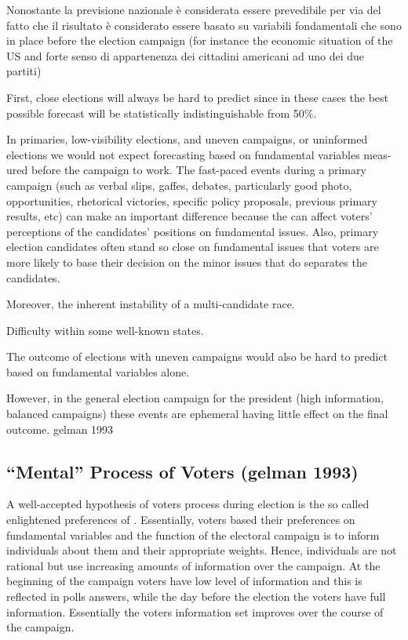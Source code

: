 \documentclass[
  12pt]{article}
\begin{document}
Nonostante la previsione nazionale è considerata essere prevedibile per
via del fatto che il risultato è considerato essere basato su variabili
fondamentali che sono in place before the election campaign (for
instance the economic situation of the US and forte senso di
appartenenza dei cittadini americani ad uno dei due partiti)

First, close elections will always be hard to predict since in these
cases the best possible forecast will be statistically indistinguishable
from 50\%.

In primaries, low-visibility elections, and uneven campaigns, or
uninformed elections we would not expect forecasting based on
fundamental variables meas- ured before the campaign to work. The
fast-paced events during a primary campaign (such as verbal slips,
gaffes, debates, particularly good photo, opportunities, rhetorical
victories, specific policy proposals, previous primary results, etc) can
make an important difference because the can affect voters' perceptions
of the candidates' positions on fundamental issues. Also, primary
election candidates often stand so close on fundamental issues that
voters are more likely to base their decision on the minor issues that
do separates the candidates.

Moreover, the inherent instability of a multi-candidate race.

Difficulty within some well-known states.

The outcome of elections with uneven campaigns would also be hard to
predict based on fundamental variables alone.

However, in the general election campaign for the president (high
information, balanced campaigns) these events are ephemeral having
little effect on the final outcome. gelman 1993

\hypertarget{mental-process-of-voters-gelman-1993}{%
\subsection{``Mental'' Process of Voters (gelman
1993)}\label{mental-process-of-voters-gelman-1993}}

A well-accepted hypothesis of voters process during election is the so
called enlightened preferences of \citet{gelman1993}. Essentially,
voters based their preferences on fundamental variables and the function
of the electoral campaign is to inform individuals about them and their
appropriate weights. Hence, individuals are not rational but use
increasing amounts of information over the campaign. At the beginning of
the campaign voters have low level of information and this is reflected
in polls answers, while the day before the election the voters have full
information. Essentially the voters information set improves over the
course of the campaign.
\end{document}
